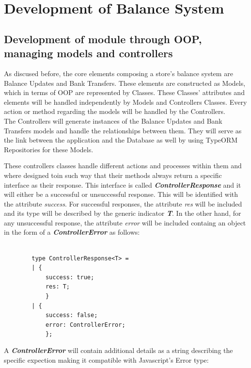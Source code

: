 \chapter{Development of Balance System}

\section{Development of module through OOP, managing models and controllers}

As discused before, the core elements composing a store's balance system are Balance Updates and Bank Transfers. These elements are constructed as Models, which in terms of OOP are represented by Classes. These Classes' attributes and elements will be handled independently by Models and Controllers Classes. Every action or method regarding the models will be handled by the Controllers.\\

The Controllers will generate instances of the Balance Updates and Bank Transfers models and handle the relationships between them. They will serve as the link between the application and the Database as well by using TypeORM Repositories for these Models.

These controllers classes handle different actions and processes within them and where designed toin such way that their methods always return a specific interface as their response. This interface is called \textbf{\textit{ControllerResponse}} and it will either be a successful or unsuccessful response. This will be identified with the attribute \textit{success}. For successful responses, the attribute \textit{res} will be included and its type will be described by the generic indicator \textbf{\textit{T}}. In the other hand, for any unsuccessful response, the attribute \textit{error} will be included containg an object in the form of a \textbf{\textit{ControllerError}} as follows:

    
    \begin{verbatim}
        
        type ControllerResponse<T> =
        | {
            success: true; 
            res: T;
            }
        | {
            success: false;
            error: ControllerError;
            };
            \end{verbatim}
            
A \textbf{\textit{ControllerError}} will contain additional details as a string describing the specific expection making it compatible with Javascript's Error type:
            
